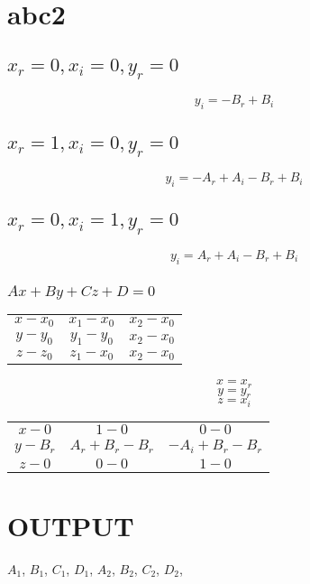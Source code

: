 \documentclass[a4paper]{article}
\begin{document}
\section{abc2}
\subsection{$x_r = 0, x_i = 0, y_r = 0$}
$$ y_i = -B_r + B_i $$

\subsection{$x_r = 1, x_i = 0, y_r = 0$}
$$ y_i = -A_r + A_i - B_r + B_i $$

\subsection{$x_r = 0, x_i = 1, y_r = 0$}
$$ y_i = A_r + A_i - B_r + B_i $$


\subsubsection{$ Ax + By + Cz + D = 0 $}
\begin{table}[h]
    \centering
    \begin{tabular}{| c c c |}
        $x - x_0 $ & $ x_1 - x_0 $ & $ x_2 - x_0 $ \\
        $y - y_0 $ & $ y_1 - y_0 $ & $ x_2 - x_0 $ \\
        $z - z_0 $ & $ z_1 - x_0 $ & $ x_2 - x_0 $ \\
    \end{tabular}
\end{table}

$$ x = x_r $$
$$ y = y_r $$
$$ z = x_i $$
\begin{table}[h]
    \centering
    \begin{tabular}{| c c c |}
        $x - 0$   & $ 1 - 0           $ & $ 0 - 0$ \\
        $y - B_r$ & $ A_r + B_r - B_r $ & $ -A_i + B_r - B_r $ \\
        $z - 0$   & $ 0 - 0           $ & $ 1 - 0$ \\
    \end{tabular}
\end{table}


\section{OUTPUT}
$A_1$, $B_1$, $C_1$, $D_1$,
$A_2$, $B_2$, $C_2$, $D_2$,
\end{document}
